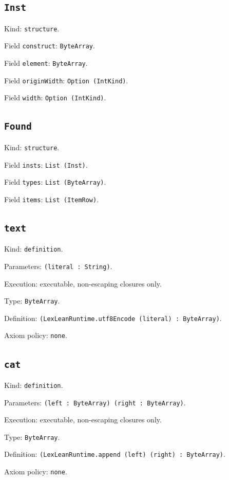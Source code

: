 \documentclass[11pt]{article}
\begin{document}
\subsection*{\texttt{Inst}}
\noindent Kind: \texttt{structure}.\par
\noindent Field \texttt{construct}: \texttt{ByteArray}.\par
\noindent Field \texttt{element}: \texttt{ByteArray}.\par
\noindent Field \texttt{originWidth}: \texttt{Option (IntKind)}.\par
\noindent Field \texttt{width}: \texttt{Option (IntKind)}.\par
\subsection*{\texttt{Found}}
\noindent Kind: \texttt{structure}.\par
\noindent Field \texttt{insts}: \texttt{List (Inst)}.\par
\noindent Field \texttt{types}: \texttt{List (ByteArray)}.\par
\noindent Field \texttt{items}: \texttt{List (ItemRow)}.\par
\subsection*{\texttt{text}}
\noindent Kind: \texttt{definition}.\par
\noindent Parameters: \texttt{(literal : String)}.\par
\noindent Execution: executable, non-escaping closures only.\par
\noindent Type: \texttt{ByteArray}.\par
\noindent Definition: \texttt{(LexLeanRuntime.utf8Encode (literal) : ByteArray)}.\par
\noindent Axiom policy: \texttt{none}.\par
\subsection*{\texttt{cat}}
\noindent Kind: \texttt{definition}.\par
\noindent Parameters: \texttt{(left : ByteArray) (right : ByteArray)}.\par
\noindent Execution: executable, non-escaping closures only.\par
\noindent Type: \texttt{ByteArray}.\par
\noindent Definition: \texttt{(LexLeanRuntime.append (left) (right) : ByteArray)}.\par
\noindent Axiom policy: \texttt{none}.\par
\end{document}
